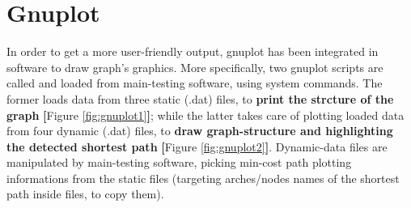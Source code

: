 \documentclass{article}                                                                                                     %
\begin{document}
\section{Gnuplot}                                                                                                           %
\label{sec:gnuplot}                                                                                                         %
  In order to get a more user-friendly output, gnuplot has been integrated in software to draw graph's graphics. More       %
  specifically, two gnuplot scripts are called and loaded from main-testing software, using system commands. The former
  loads data from three static (.dat) files, to \textbf{print the strcture of the graph}
  \textbf{[}Figure \ref{fig:gnuplot1}\textbf{]}; while the latter takes care of plotting loaded data from four
  dynamic (.dat) files, to \textbf{draw graph-structure and highlighting the detected shortest path}
  \textbf{[}Figure \ref{fig:gnuplot2}\textbf{]}. Dynamic-data files are manipulated by main-testing software,
  picking min-cost path plotting informations from the static files (targeting arches/nodes names of the shortest
  path inside files, to copy them).
\end{document}
